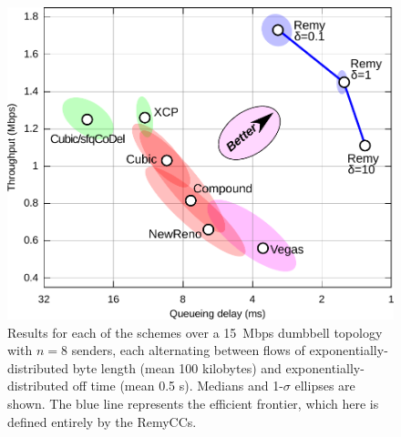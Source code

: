\begin{figure}
\includegraphics[width=\columnwidth]{eth8-final-bytes.pdf}
\caption{Results for each of the schemes over a 15~Mbps dumbbell
  topology with $n = 8$ senders, each alternating between flows of
  exponentially-distributed byte length (mean 100 kilobytes) and
  exponentially-distributed off time (mean 0.5 s). Medians and
  1-$\sigma$ ellipses are shown. The blue line represents the
  efficient frontier, which here is defined entirely by
  the RemyCCs.}

\label{f:tpdelaydb4}

\end{figure}

